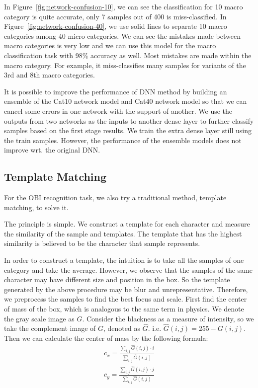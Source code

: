 \documentclass[journal]{IEEEtran}
\begin{document}
In Figure~\ref{fig:network-confusion-10}, we can see the classification for 10 macro category is quite accurate, only 7 samples out of 400 is miss-classified.
In Figure~\ref{fig:network-confusion-40}, we use solid lines to separate 10 macro categories among 40 micro categories.
We can see the mistakes made between macro categories is very low and we can use this model for the macro classification task with 98\% accuracy as well.
Most mistakes are made within the macro category.
For example, it miss-classifies many samples for variants of the 3rd and 8th macro categories.

It is possible to improve the performance of DNN method by building an ensemble of the Cat10 network model and Cat40 network model so that we can cancel some errors in one network with the support of another.
We use the outputs from two networks as the inputs to another dense layer to further classify samples based on the first stage results.
We train the extra dense layer still using the train samples.
However, the performance of the ensemble models does not improve wrt. the original DNN.

\subsection{Template Matching}
For the OBI recognition task, we also try a traditional method, template matching, to solve it.

The principle is simple. We construct a template for each character and measure the similarity of the sample and templates. The template that has the highest similarity is believed to be the character that sample represents.

In order to construct a template, the intuition is to take all the samples of one category and take the average. However, we observe that the samples of the same character may have different size and position in the box. So the template generated by the above procedure may be blur and unrepresentative. Therefore, we preprocess the samples to find the best focus and scale. First find the center of mass of the box, which is analogous to the same term in physics. We denote the gray scale image as $G$. Consider the blackness as a measure of intensity, so we take the complement image of $G$, denoted as $\hat{G}$. i.e. $\hat{G}(i,j)=255-G(i,j)$. Then we can calculate the center of mass by the following formula:
\begin{align*}
	c_x=\frac{\sum_{i,j}\hat{G}(i,j)\cdot i}{\sum_{i,j} \hat{G}(i,j)} \\
	c_y=\frac{\sum_{i,j}\hat{G}(i,j)\cdot j}{\sum_{i,j} \hat{G}(i,j)}
\end{align*}
\end{document}
